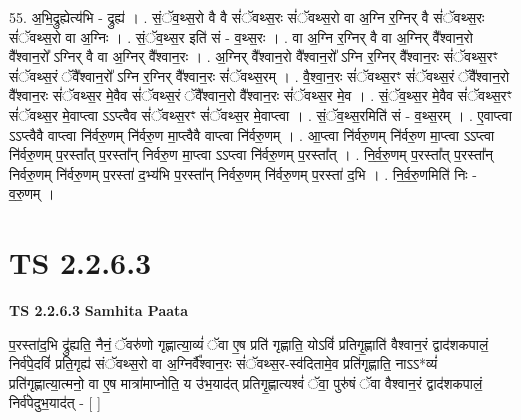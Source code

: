 \documentclass[17pt]{extarticle}
\begin{document}
55. अ॒भि॒द्रुह्येत्य॑भि - द्रुह्य॑ । . सं॒ॅव॒थ्स॒रो वै वै सं॑ॅवथ्स॒रः सं॑ॅवथ्स॒रो वा अ॒ग्नि र॒ग्निर् वै सं॑ॅवथ्स॒रः सं॑ॅवथ्स॒रो वा अ॒ग्निः । . सं॒ॅव॒थ्स॒र इति॑ सं - व॒थ्स॒रः । . वा अ॒ग्नि र॒ग्निर् वै वा अ॒ग्निर् वै᳚श्वान॒रो वै᳚श्वान॒रो᳚ ऽग्निर् वै वा अ॒ग्निर् वै᳚श्वान॒रः । . अ॒ग्निर् वै᳚श्वान॒रो वै᳚श्वान॒रो᳚ ऽग्नि र॒ग्निर् वै᳚श्वान॒रः सं॑ॅवथ्स॒रꣳ सं॑ॅवथ्स॒रं ॅवै᳚श्वान॒रो᳚ ऽग्नि र॒ग्निर् वै᳚श्वान॒रः सं॑ॅवथ्स॒रम् । . वै॒श्वा॒न॒रः सं॑ॅवथ्स॒रꣳ सं॑ॅवथ्स॒रं ॅवै᳚श्वान॒रो वै᳚श्वान॒रः सं॑ॅवथ्स॒र मे॒वैव सं॑ॅवथ्स॒रं ॅवै᳚श्वान॒रो वै᳚श्वान॒रः सं॑ॅवथ्स॒र मे॒व । . सं॒ॅव॒थ्स॒र मे॒वैव सं॑ॅवथ्स॒रꣳ सं॑ॅवथ्स॒र मे॒वाप्त्वा ऽऽप्त्वैव सं॑ॅवथ्स॒रꣳ सं॑ॅवथ्स॒र मे॒वाप्त्वा । . सं॒ॅव॒थ्स॒रमिति॑ सं - व॒थ्स॒रम् । . ए॒वाप्त्वा ऽऽप्त्वैवै वाप्त्वा नि॑र्वरु॒णम् नि॑र्वरु॒ण मा॒प्त्वैवै वाप्त्वा नि॑र्वरु॒णम् । . आ॒प्त्वा नि॑र्वरु॒णम् नि॑र्वरु॒ण मा॒प्त्वा ऽऽप्त्वा नि॑र्वरु॒णम् प॒रस्ता᳚त् प॒रस्ता᳚न् निर्वरु॒ण मा॒प्त्वा ऽऽप्त्वा नि॑र्वरु॒णम् प॒रस्ता᳚त् । . नि॒र्व॒रु॒णम् प॒रस्ता᳚त् प॒रस्ता᳚न् निर्वरु॒णम् नि॑र्वरु॒णम् प॒रस्ता॑ द॒भ्य॑भि प॒रस्ता᳚न् निर्वरु॒णम् नि॑र्वरु॒णम् प॒रस्ता॑ द॒भि । . नि॒र्व॒रु॒णमिति॑ निः - व॒रु॒णम् । \newline
\pagebreak
{}

\section{ TS 2.2.6.3 }

\textbf{TS 2.2.6.3 } \newline
\textbf{Samhita Paata} \newline

प॒रस्ता॑द॒भि द्रु॑ह्यति॒ नैनं॒ ॅवरु॑णो गृह्णात्या॒व्यं॑ ॅवा ए॒ष प्रति॑ गृह्णाति॒ योऽविं॑ प्रतिगृ॒ह्णाति॑ वैश्वान॒रं द्वाद॑शकपालं॒ निर्व॑पे॒दविं॑ प्रति॒गृह्य॑ संॅवथ्स॒रो वा अ॒ग्निर्वै᳚श्वान॒रः सं॑ॅवथ्स॒र-स्व॑दितामे॒व प्रति॑गृह्णाति॒ नाऽऽ*व्यं॑ प्रति॑गृह्णात्या॒त्मनो॒ वा ए॒ष मात्रा॑माप्नोति॒ य उ॑भ॒याद॑त् प्रतिगृ॒ह्णात्यश्वं॑ ॅवा॒ पुरु॑षं ॅवा वैश्वान॒रं द्वाद॑शकपालं॒ निर्व॑पेदुभ॒याद॑त् - [  ] \newline
\end{document}
